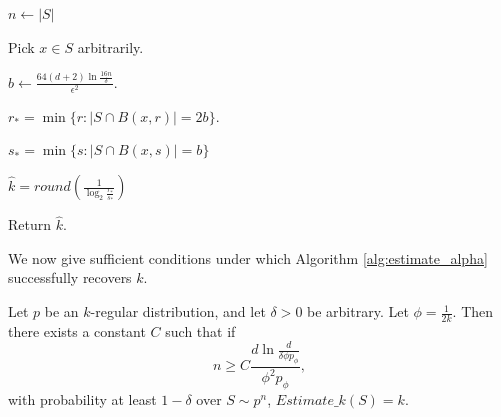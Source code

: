 \begin{algorithm}
   \caption{$Estimate\_k(S)$}
   \label{alg:estimate_alpha}

   \DontPrintSemicolon

	$n \leftarrow |S|$\;
	
	Pick $x \in S$ arbitrarily.\;
	
   $b \leftarrow \frac{64(d+2)\ln\frac{16n}{\delta}}{\epsilon^2}.$\;
   
   $r_* = \min \{r: |S \cap B(x, r)| = 2b\}$.\;
   
  $s_* =\min \{s: |S \cap B(x, s)| = b\}$\;
  
  $\hat{k} = round \left(\frac{1}{\log_2 \frac{r_*}{s_*}} \right)$\;
  
  Return $\hat{k}$. 

\end{algorithm}

We now give sufficient conditions under which Algorithm \ref{alg:estimate_alpha} successfully recovers $k$. 

\begin{proposition}
Let $p$ be an $k$-regular distribution, and let $\delta > 0$ be arbitrary. Let $\phi = \frac{1}{2k}$. Then there exists a constant $C$ such that if $$n \geq C\frac{d\ln\frac{d}{\delta\phi p_\phi}}{\phi^2 p_\phi},$$ with probability at least $1 - \delta$ over $S \sim p^n$, $Estimate\_k(S) = k$. 
\end{proposition}

